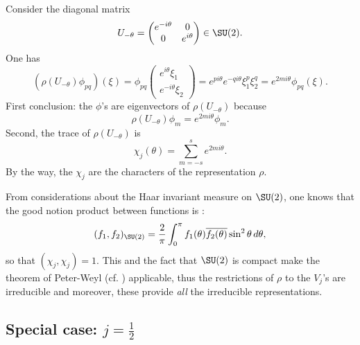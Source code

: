 Consider the diagonal matrix
\[   U_{-\theta}=\begin{pmatrix}
e^{-i\theta} & 0 \\ 
0 & e^{i\theta}
\end{pmatrix} \in\SU(2).
\]
One has
\begin{equation}
  \left(\rho(U_{-\theta})\phi_{pq}\right)(\xi)=\phi_{pq}
\begin{pmatrix}
   e^{i\theta}\xi_1 \\ 
    e^{-i\theta}\xi_2
\end{pmatrix}
                                               = e^{pi\theta} e^{-qi\theta}\xi_1^p\xi_2^q
					       =e^{2mi\theta}\phi_{pq}(\xi).
\end{equation}
First conclusion: the $\phi$'s are eigenvectors of $\rho(U_{-\theta})$ because
\[
   \rho(U_{-\theta})\phi_m=e^{2mi\theta}\phi_m.
\]
Second, the trace of $\rho(U_{-\theta})$ is
\begin{equation}
   \chi_j(\theta)=\sum_{m=-s}^{s}e^{2mi\theta}.
\end{equation}
By the way, the $\chi_j$ are the characters of the representation $\rho$.

From considerations about the Haar\quextproj{} invariant measure on $\SU(2)$, one knows that the good notion product between functions is :
\begin{equation}
(f_1,f_2)_{\SU(2)}=\frac{2}{\pi}\int_0^{\pi}f_1(\theta)\overline{ f_2(\theta) }\sin^2\theta\,d\theta,
\end{equation}
so that $(\chi_j,\chi_j)=1$. This and the fact that $\SU(2)$ is compact make the theorem of Peter-Weyl (cf. \cite{Sternberg}) applicable, thus the restrictions of $\rho$ to the $V_j$'s are irreducible and moreover, these provide \emph{all} the irreducible representations.

\subsection{Special case: \texorpdfstring{$j=\frac{1}{2}$}{j=1/2}}

